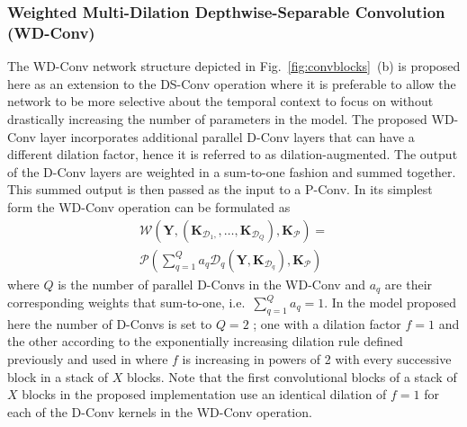 \documentclass{article}
\newcommand{\vek}[1]{\ensuremath{\mathbf{#1}}}    \newcommand{\vekc}[1]{\ensuremath{\boldsymbol{\mathcal{#1}}}}
\begin{document}
\subsubsection{Weighted Multi-Dilation Depthwise-Separable Convolution (WD-Conv)}
\label{sec:multi_dilation_dsconv}
The \ac{WD-Conv} network structure depicted in Fig.~\ref{fig:convblocks}~(b) is proposed here as an extension to the \ac{DS-Conv} operation where it is preferable to allow the network to be more selective about the temporal context to focus on without drastically increasing the number of parameters in the model. The proposed \ac{WD-Conv} layer incorporates additional parallel \ac{D-Conv} layers that can have a different dilation factor, hence it is referred to as dilation-augmented. The output of the \ac{D-Conv} layers are weighted in a sum-to-one fashion and summed together. This summed output is then passed as the input to a \ac{P-Conv}. In its simplest form the \ac{WD-Conv} operation can be formulated as
\begin{multline}
    \label{eq:wdconf}
    \mathcal{W}\left(\vek{Y},\left(\vek{K}_{\mathcal{D}_1,},\ldots,\vek{K}_{\mathcal{D}_Q}\right),\mathbf{K}_{\mathcal{P}}\right)=\\
    \mathcal{P}\left(\sum_{q=1}^Q a_q\mathcal{D}_q\left(\vek{Y},\vek{K}_{\mathcal{D}_q}\right),\mathbf{K}_{\mathcal{P}}\right)
\end{multline}
where $Q$ is the number of parallel \acp{D-Conv} in the \ac{WD-Conv} and $a_q$ are their corresponding weights that sum-to-one, i.e.~$\sum_{q=1}^Q a_q=1$. In the model proposed here the number of \acp{D-Conv} is set to $Q=2$ ; one with a dilation factor $f=1$ and the other according to the exponentially increasing dilation rule defined previously and used in \cite{convtasnet,rfield,atttasnet} where $f$ is increasing in powers of 2 with every successive block in a stack of $X$ blocks. Note that the first convolutional blocks of a stack of $X$ blocks in the proposed implementation use an identical dilation of $f=1$ for each of the \ac{D-Conv} kernels in the \ac{WD-Conv} operation.
\end{document}
